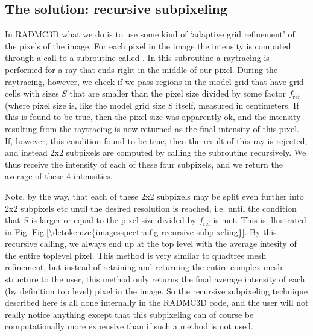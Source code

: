 \documentclass[letterpaper,10pt,english]{sphinxmanual}
\begin{document}
\subsection{The solution: recursive sub\sphinxhyphen{}pixeling}
\label{\detokenize{imagesspectra:the-solution-recursive-sub-pixeling}}\label{\detokenize{imagesspectra:sec-recursive-subpixeling}}
In RADMC\sphinxhyphen{}3D what we do is to use some kind of ‘adaptive grid refinement’ of the
pixels of the image. For each pixel in the image the intensity is computed
through a call to a subroutine called . In this
subroutine a ray\sphinxhyphen{}tracing is performed for a ray that ends right in the middle of
our pixel. During the ray\sphinxhyphen{}tracing, however, we check if we pass regions in the
model grid that have grid cells with sizes \(S\) that are smaller than the
pixel size divided by some factor \(f_{\mathrm{ref}}\) (where pixel size is,
like the model grid size S itself, measured in centimeters. If this is found
 to be true, then the pixel size was apparently ok, and the intensity
resulting from the ray\sphinxhyphen{}tracing is now returned as the final intensity of this
pixel. If, however, this condition  found to be true, then the result of
this ray is rejected, and instead 2x2 sub\sphinxhyphen{}pixels are computed by calling the
 subroutine recursively. We thus receive the
intensity of each of these four sub\sphinxhyphen{}pixels, and we return the average of these 4
intensities.

Note, by the way, that each of these 2x2 subpixels may be split even further
into 2x2 sub\sphinxhyphen{}pixels etc until the desired resolution is reached, i.e. until
the condition that \(S\) is larger or equal to the pixel size divided by
\(f_{\mathrm{ref}}\) is met. This is illustrated in Fig.
\hyperref[\detokenize{imagesspectra:fig-recursive-subpixeling}]{Fig.\@ \ref{\detokenize{imagesspectra:fig-recursive-subpixeling}}}. By this recursive calling, we always end up at
the top level with the average intesity of the entire top\sphinxhyphen{}level pixel.  This
method is very similar to quad\sphinxhyphen{}tree mesh refinement, but instead of
retaining and returning the entire complex mesh structure to the user, this
method only returns the final average intensity of each (by definition top
level) pixel in the image. So the recursive sub\sphinxhyphen{}pixeling technique described
here is all done internally in the RADMC\sphinxhyphen{}3D code, and the user will not
really notice anything except that this sub\sphinxhyphen{}pixeling can of course be
computationally more expensive than if such a method is not used.
\end{document}
